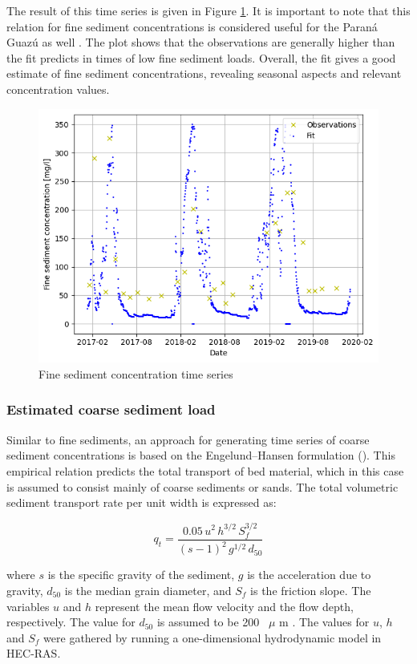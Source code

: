 The result of this time series is given in Figure \ref{fig:timeseries fine sediments}. It is important to note that this relation for fine sediment concentrations is considered useful for the Paraná Guazú as well \autocite{reMetodologiaParaGeneracion2009}. The plot shows that the observations are generally higher than the fit predicts in times of low fine sediment loads. Overall, the fit gives a good estimate of fine sediment concentrations, revealing seasonal aspects and relevant concentration values.

\begin{figure}[H]
    \centering
    \includegraphics[width=0.5\linewidth]{figures/ch6/fine sediment concentrations.png}
    \caption{Fine sediment concentration time series}
    \label{fig:timeseries fine sediments}
\end{figure}


\subsubsection{Estimated coarse sediment load}
Similar to fine sediments, an approach for generating time series of coarse sediment concentrations is based on the Engelund–Hansen formulation (\cite{engelundMonographSedimentTransport1967}). This empirical relation predicts the total transport of bed material, which in this case is assumed to consist mainly of coarse sediments or sands. The total volumetric sediment transport rate per unit width is expressed as:

\begin{equation}
    q_{t} = \frac{0.05\,u^{2}\,h^{3/2}\,S_{f}^{3/2}}{(s - 1)^{2}\,g^{1/2}\,d_{50}}
    \label{eq:engelund_hansen}
\end{equation}

where \( s \) is the specific gravity of the sediment, \( g \) is the acceleration due to gravity, \( d_{50} \) is the median grain diameter, and \( S_{f} \) is the friction slope. The variables \( u \) and \( h \) represent the mean flow velocity and the flow depth, respectively. The value for $d_{50}$ is assumed to be 200 ~$\mu$ m \autocite{reMetodologiaParaGeneracion2009}. The values for $u$, $h$ and $S_f$ were gathered by running a one-dimensional hydrodynamic model in HEC-RAS. 


